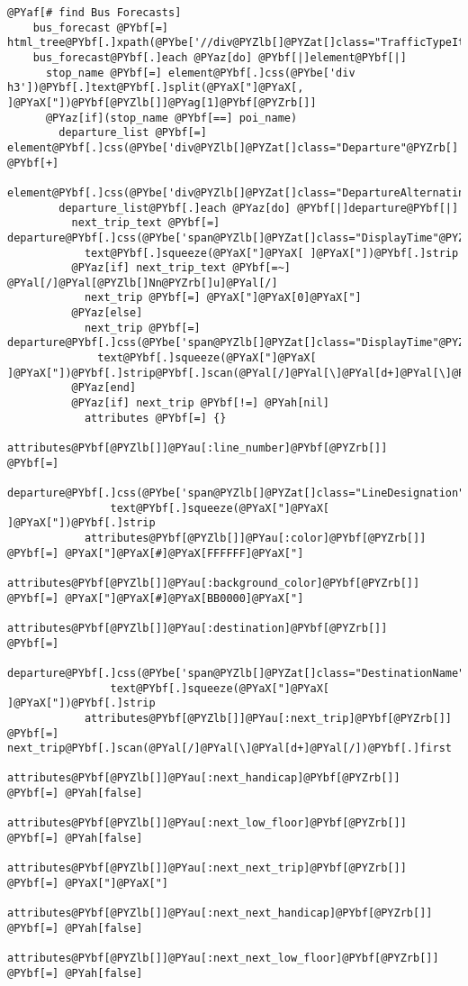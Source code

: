 \begin{Verbatim}[commandchars=@\[\]]
    @PYaf[# find Bus Forecasts]
    bus_forecast @PYbf[=] html_tree@PYbf[.]xpath(@PYbe['//div@PYZlb[]@PYZat[]class="TrafficTypeItem"@PYZrb[]'])
    bus_forecast@PYbf[.]each @PYaz[do] @PYbf[|]element@PYbf[|]
      stop_name @PYbf[=] element@PYbf[.]css(@PYbe['div h3'])@PYbf[.]text@PYbf[.]split(@PYaX["]@PYaX[, ]@PYaX["])@PYbf[@PYZlb[]]@PYag[1]@PYbf[@PYZrb[]]
      @PYaz[if](stop_name @PYbf[==] poi_name)
        departure_list @PYbf[=]    element@PYbf[.]css(@PYbe['div@PYZlb[]@PYZat[]class="Departure"@PYZrb[]']) @PYbf[+]
          element@PYbf[.]css(@PYbe['div@PYZlb[]@PYZat[]class="DepartureAlternating"@PYZrb[]'])
        departure_list@PYbf[.]each @PYaz[do] @PYbf[|]departure@PYbf[|]
          next_trip_text @PYbf[=] departure@PYbf[.]css(@PYbe['span@PYZlb[]@PYZat[]class="DisplayTime"@PYZrb[]'])@PYbf[.]
            text@PYbf[.]squeeze(@PYaX["]@PYaX[ ]@PYaX["])@PYbf[.]strip
          @PYaz[if] next_trip_text @PYbf[=~] @PYal[/]@PYal[@PYZlb[]Nn@PYZrb[]u]@PYal[/]
            next_trip @PYbf[=] @PYaX["]@PYaX[0]@PYaX["]
          @PYaz[else]
            next_trip @PYbf[=] departure@PYbf[.]css(@PYbe['span@PYZlb[]@PYZat[]class="DisplayTime"@PYZrb[]'])@PYbf[.]
              text@PYbf[.]squeeze(@PYaX["]@PYaX[ ]@PYaX["])@PYbf[.]strip@PYbf[.]scan(@PYal[/]@PYal[\]@PYal[d+]@PYal[\]@PYal[smin]@PYal[/])@PYbf[.]first
          @PYaz[end]
          @PYaz[if] next_trip @PYbf[!=] @PYah[nil]
            attributes @PYbf[=] {}
            attributes@PYbf[@PYZlb[]]@PYau[:line_number]@PYbf[@PYZrb[]]       @PYbf[=]
              departure@PYbf[.]css(@PYbe['span@PYZlb[]@PYZat[]class="LineDesignation"@PYZrb[]'])@PYbf[.]
                text@PYbf[.]squeeze(@PYaX["]@PYaX[ ]@PYaX["])@PYbf[.]strip
            attributes@PYbf[@PYZlb[]]@PYau[:color]@PYbf[@PYZrb[]]             @PYbf[=] @PYaX["]@PYaX[#]@PYaX[FFFFFF]@PYaX["]
            attributes@PYbf[@PYZlb[]]@PYau[:background_color]@PYbf[@PYZrb[]]  @PYbf[=] @PYaX["]@PYaX[#]@PYaX[BB0000]@PYaX["]
            attributes@PYbf[@PYZlb[]]@PYau[:destination]@PYbf[@PYZrb[]]       @PYbf[=]
              departure@PYbf[.]css(@PYbe['span@PYZlb[]@PYZat[]class="DestinationName"@PYZrb[]'])@PYbf[.]
                text@PYbf[.]squeeze(@PYaX["]@PYaX[ ]@PYaX["])@PYbf[.]strip
            attributes@PYbf[@PYZlb[]]@PYau[:next_trip]@PYbf[@PYZrb[]]         @PYbf[=] next_trip@PYbf[.]scan(@PYal[/]@PYal[\]@PYal[d+]@PYal[/])@PYbf[.]first
            attributes@PYbf[@PYZlb[]]@PYau[:next_handicap]@PYbf[@PYZrb[]]        @PYbf[=] @PYah[false]
            attributes@PYbf[@PYZlb[]]@PYau[:next_low_floor]@PYbf[@PYZrb[]]       @PYbf[=] @PYah[false]
            attributes@PYbf[@PYZlb[]]@PYau[:next_next_trip]@PYbf[@PYZrb[]]       @PYbf[=] @PYaX["]@PYaX["]
            attributes@PYbf[@PYZlb[]]@PYau[:next_next_handicap]@PYbf[@PYZrb[]]   @PYbf[=] @PYah[false]
            attributes@PYbf[@PYZlb[]]@PYau[:next_next_low_floor]@PYbf[@PYZrb[]]  @PYbf[=] @PYah[false]


\end{Verbatim}
